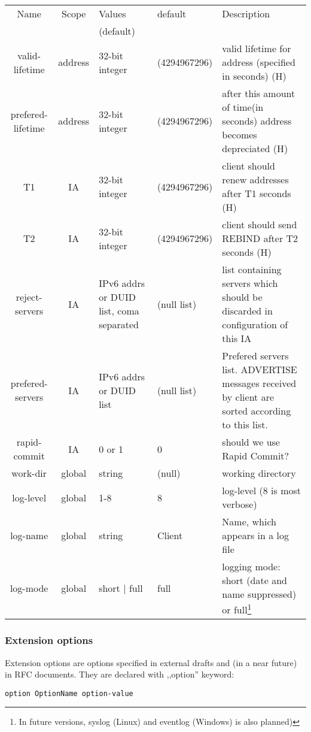 \begin{tabular}{|c|c|p{2.5cm}|p{3cm}|p{6cm}|}
\hline
Name           & Scope & Values & default & Description \\
               &       & (default) &    & \\
\hline
valid-lifetime    & address& 32-bit integer & (4294967296) & valid lifetime for address (specified in seconds) (H)\\
prefered-lifetime&address& 32-bit integer& (4294967296) & after this amount of time(in seconds) address becomes depreciated (H)\\
T1               & IA     & 32-bit integer & (4294967296) & client should renew addresses after T1 seconds (H)\\
T2               & IA     & 32-bit integer & (4294967296) & client should send REBIND after T2 seconds (H)\\
reject-servers   & IA     & IPv6 addrs or DUID list, coma separated &
(null list)      & list containing servers which should be discarded in configuration of this IA \\
prefered-servers & IA     & IPv6 addrs or DUID list & (null list) & Prefered servers list. ADVERTISE messages received by client are sorted according to this list. \\
rapid-commit     & IA     & 0 or 1         & 0            & should we use Rapid Commit? \\
work-dir         & global & string & (null) & working directory \\
log-level        & global & 1-8    & 8    & log-level (8 is most verbose) \\
log-name         & global & string & Client & Name, which appears in a log file\\
log-mode         & global & short | full & full & logging mode: short (date
and name suppressed) or full\footnote{In future versions, syslog (Linux) and
  eventlog (Windows) is also planned)} \\
\hline
\end{tabular}

\subsubsection{Extension options}
Extension options are options specified in external drafts and (in a
near future) in RFC documents. They are declared with ,,option''
keyword:

\begin{verbatim}
option OptionName option-value
\end{verbatim}


